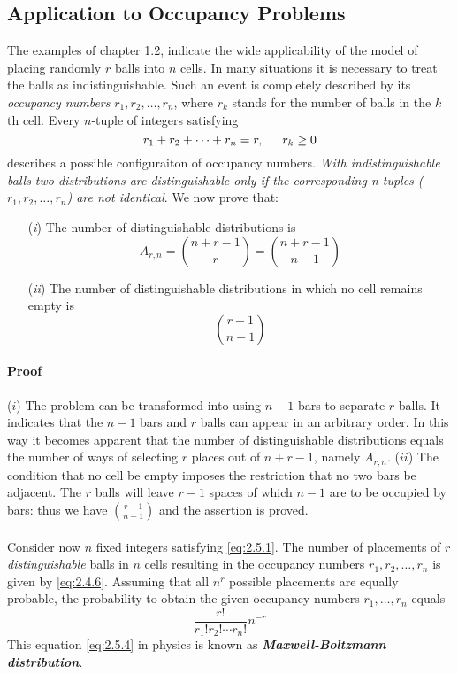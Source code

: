 \documentclass{article}
\numberwithin{equation}{subsection}
\begin{document}
		\subsection{Application to Occupancy Problems} The examples of chapter 1.2, indicate the wide applicability of the model of placing randomly $r$ balls into $n$ cells. In many situations it is necessary to treat the balls as indistinguishable. Such an event is completely described by its \textit{occupancy numbers} $r_1,r_2,\dots,r_n$, where $r_k$ stands for the number of balls in the $k$th cell. Every $n$-tuple of integers satisfying
		\begin{equation}
			\label{eq:2.5.1}
			r_1+r_2+\cdots+r_n=r,\indent r_k\geq 0
		\end{equation}
		describes a possible configuraiton of occupancy numbers.\textit{ With indistinguishable balls two distributions are distinguishable only if the corresponding n-tuples ($r_1, r_2,\dots, r_n$) are not identical}. We now prove that:
		\begin{enumerate}
		\item[(\textit{i})] The number of distinguishable distributions is
		\begin{equation}
			A_{r,n} = {n+r-1\choose r} = {n+r-1\choose n-1}
		\end{equation}
		\item[(\textit{ii})] The number of distinguishable distributions in which no cell remains empty is 
		\begin{equation}
			\label{eq:2.5.3}
			{r-1\choose n-1}
		\end{equation}

		\end{enumerate}
		\paragraph{Proof} ($i$) The problem can be transformed into using $n-1$ bars to separate $r$ balls. It indicates that the $n-1$ bars and $r$ balls can appear in an arbitrary order. In this way it becomes apparent that the number of distinguishable distributions equals the number of ways of selecting $r$ places out of $n+r-1$, namely $A_{r,n}$. ($ii$) The condition that no cell be empty imposes the restriction that no two bars be adjacent. The $r$ balls will leave $r-1$ spaces of which $n-1$ are to be occupied by bars: thus we have $r-1 \choose n-1$ and the assertion is proved.
		\paragraph{} Consider now $n$ fixed integers satisfying \eqref{eq:2.5.1}. The number of placements of $r$ \textit{distinguishable} balls in $n$ cells resulting in the occupancy numbers $r_1, r_2, \dots, r_n$ is given by \eqref{eq:2.4.6}. Assuming that all $n^r$ possible placements are equally probable, the probability to obtain the given occupancy numbers $r_1,\dots,r_n$ equals
		\begin{equation}
			\label{eq:2.5.4}
			\frac{r!}{r_1!r_2!\cdots r_n!}n^{-r}
		\end{equation}
		This equation \eqref{eq:2.5.4} in physics is known as \textit{\textbf{Maxwell-Boltzmann distribution}}.
\end{document}
